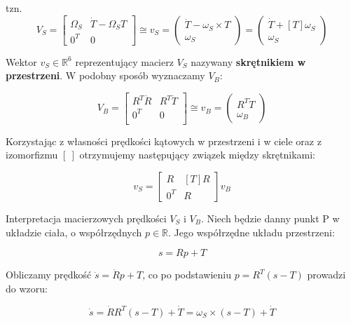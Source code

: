\documentclass{article}
\begin{document}
tzn.
\Large
$$
    V_{S}=
    \begin{bmatrix}
        \Omega_{S} & \dot T-\Omega_{S}T \\[0.3em]
        0^{T}      & 0
    \end{bmatrix}
    \cong
    v_{S}
    =
    \begin{pmatrix}
        \dot T-\omega_{S}\times T \\[0.3em]
        \omega_{S}
    \end{pmatrix}
    =
    \begin{pmatrix}
        \dot T + \left[T\right]\omega_{S} \\[0.3em]
        \omega_{S}
    \end{pmatrix}
$$
\normalsize
\newpage

Wektor $v_{S} \in \mathbb{R}^{6}$ reprezentujący macierz $V_{S}$ nazywany {\bf skrętnikiem w przestrzeni}. W podobny sposób wyznaczamy $V_{B}$:

$$
    V_{B}=
    \begin{bmatrix}
        R^{T}\dot R & R^{T}\dot T \\[0.3em]
        0^{T}       & 0           \\[0.3em]
    \end{bmatrix}
    \cong
    v_{B}
    =
    \begin{pmatrix}
        R^{T}\dot T \\[0.3em]
        \omega_{B}
    \end{pmatrix}
$$

Korzystając z własności prędkości kątowych w przestrzeni i w ciele oraz z izomorfizmu $\left[ \ \right]$ otrzymujemy następujący związek między skrętnikami:

$$
    v_{S}=
    \begin{bmatrix}
        R     & \left[T\right]R \\[0.3em]
        0^{T} & R
    \end{bmatrix}
    v_{B}
$$



Interpretacja macierzowych prędkości $V_{S}$ i $V_{B}$. Niech będzie danny punkt P w układzie ciała, o współrzędnych $p \in \mathbb{R}$. Jego współrzędne układu przestrzeni:

$$
    s=Rp+T
$$

Obliczamy prędkość $\dot s=\dot R p + T$, co po podstawieniu $p=R^{T}\left(s-T\right)$ prowadzi do wzoru:

$$
    \dot s = \dot R R^{T} (s-T)+\dot T= \omega_{S}\times (s-T)+\dot T
$$
\end{document}
